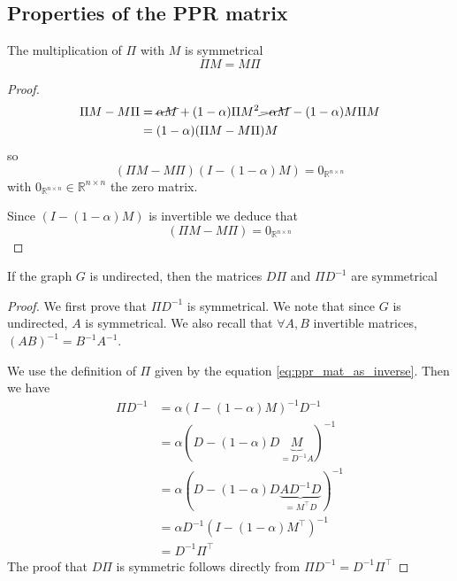 \subsection{Properties of the PPR matrix}
\begin{theorem} The multiplication of $\Pi$ with $M$ is symmetrical
    \[\Pi M = M \Pi\]
\end{theorem}
\begin{proof}
    \begin{equation*}
    \begin{split}
        \Pi M - M \Pi & = \cancel{\alpha M} + (1-\alpha)\Pi M^2 \cancel{- \alpha M} - (1-\alpha) M \Pi M\\
        & = (1-\alpha)(\Pi M - M \Pi) M
    \end{split}
\end{equation*}
so $$(\Pi M - M \Pi)(I - (1-\alpha)M) = 0_{\mathbb{R}^{n \times n}}$$ with $0_{\mathbb{R}^{n \times n}} \in \mathbb{R}^{n \times n}$ the zero matrix.

Since $(I - (1-\alpha)M)$ is invertible we deduce that
\[(\Pi M - M \Pi) = 0_{\mathbb{R}^{n \times n}}\]
\end{proof}

\begin{theorem}
    If the graph $G$ is undirected, then the matrices $D\Pi$ and $\Pi D^{-1}$ are symmetrical
\end{theorem}
\begin{proof}
     We first prove that $\Pi D^{-1}$ is symmetrical. We note that since $G$ is undirected, $A$ is symmetrical. We also recall that $\forall A, B$ invertible matrices, $(AB)^{-1} = B^{-1} A^{-1}$.
     
     We use the definition of $\Pi$ given by the equation \ref{eq:ppr_mat_as_inverse}. Then we have 
    \begin{equation*}
        \begin{split}
            \Pi D^{-1} &= \alpha (I - (1-\alpha) M)^{-1} D^{-1}\\
            &= \alpha (D - (1-\alpha) D \underbrace{M}_{= D^{-1} A})^{-1}\\
            &= \alpha (D - (1-\alpha) D \underbrace{A D^{-1} D}_{=M^\top D})^{-1}\\ 
            &= \alpha D^{-1}(I - (1-\alpha) M^\top)^{-1}\\
            &= D^{-1}\Pi^\top
        \end{split}
    \end{equation*}
    The proof that $D\Pi$ is symmetric follows directly from $\Pi D^{-1} = D^{-1} \Pi^\top$
\end{proof}

